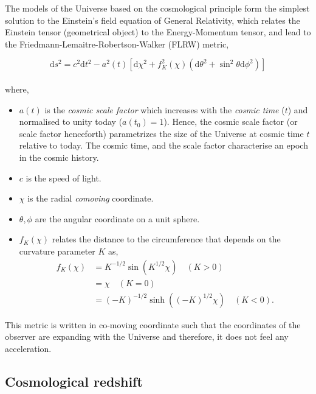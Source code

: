 \documentclass[
  11pt,
  twoside,
  openright,
  titlepage,
  headings=optiontoheadandtoc
]{scrbook}
\begin{document}
The models of the Universe based on the cosmological principle form the simplest 
solution to the Einstein's field equation of General Relativity, 
which relates the Einstein tensor (geometrical object) to the Energy-Momentum tensor, 
and lead to the
Friedmann-Lemaitre-Robertson-Walker (FLRW) metric,

\begin{equation}
	\mathrm{d}s^2 = c^2\mathrm{d}t^2 - a^2(t)\left[ \mathrm{d}\chi^2 + f_K^2(\chi)
					\left( \mathrm{d}\theta^2 + \sin^2\theta \mathrm{d}\phi^2 
					\right)  \right]
	\label{eqn:metric}
\end{equation}
\\
where, 
\begin{itemize}
\item $a(t)$ is the {\it cosmic scale factor} which increases with the {\it cosmic time} ($t$)
and normalised to unity today ($a(t_0)=1$). 
Hence, the cosmic scale factor (or scale factor henceforth) parametrizes the
size of the Universe at cosmic time $t$ relative to today. The cosmic time, 
and the scale factor characterise an epoch in the cosmic history.
\item $c$ is the speed of light. 
\item $\chi$ is the
radial {\it comoving} coordinate.
\item $\theta, \phi$ are the angular coordinate on a
unit sphere. 
\item $f_K(\chi)$ relates the distance to the circumference that depends 
on the curvature parameter $K$ as,
\begin{equation} \label{eq1}
\begin{split}
f_K(\chi) & = K^{-1/2} \sin(K^{1/2}\chi) \quad (K>0) \\
 & = \chi \quad (K=0) \\
 & = (-K)^{-1/2} \sinh((-K)^{1/2}\chi) \quad (K<0).
\end{split}
\end{equation}
\end{itemize}

This metric is written in co-moving coordinate such that the coordinates of the
observer are expanding with the Universe and therefore, it does not feel any
acceleration.



\subsection{Cosmological redshift}
\end{document}
